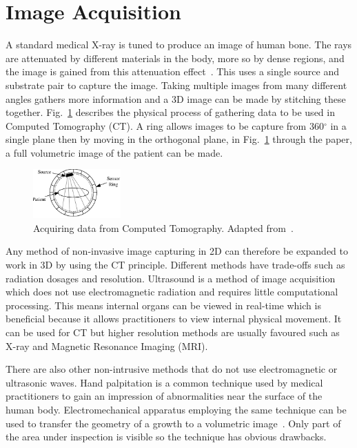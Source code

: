 \documentclass[journal]{IEEEtran}
\begin{document}
\section{Image Acquisition}
\label{sec:image}

A standard medical X-ray is tuned to produce an image of human bone.
The rays are attenuated by different materials in the body, more so by dense regions, and the image is gained from this attenuation effect~\cite{kayvan2006biomedical}. 
This uses a single source and substrate pair to capture the image.
Taking multiple images from many different angles gathers more information and a 3D image can be made by stitching these together.
Fig.~\ref{fig:ct} describes the physical process of gathering data to be used in Computed Tomography (CT).
A ring allows images to be capture from 360$^{\circ}$ in a single plane then by moving in the orthogonal plane, in Fig.~\ref{fig:ct} through the paper, a full volumetric image of the patient can be made. 

\begin{figure}[!htb]
   \centering
   \includegraphics[width = 0.3\textwidth]{Figures/CT.pdf}
   \caption{Acquiring data from Computed Tomography. Adapted from~\cite{kayvan2006biomedical}.}
   \label{fig:ct}
\end{figure}

Any method of non-invasive image capturing in 2D can therefore be expanded to work in 3D by using the CT principle.
Different methods have trade-offs such as radiation dosages and resolution.
Ultrasound is a method of image acquisition which does not use electromagnetic radiation and requires little computational processing. 
This means internal organs can be viewed in real-time which is beneficial because it allows practitioners to view internal physical movement. 
It can be used for CT but higher resolution methods are usually favoured such as X-ray and Magnetic Resonance Imaging (MRI).

There are also other non-intrusive methods that do not use electromagnetic or ultrasonic waves.
Hand palpitation is a common technique used by medical practitioners to gain an impression of abnormalities near the surface of the human body. 
Electromechanical apparatus employing the same technique can be used to transfer the geometry of a growth to a volumetric image~\cite{liu09haptic,wellman1997modeling}.  
Only part of the area under inspection is visible so the technique has obvious drawbacks.
\end{document}
